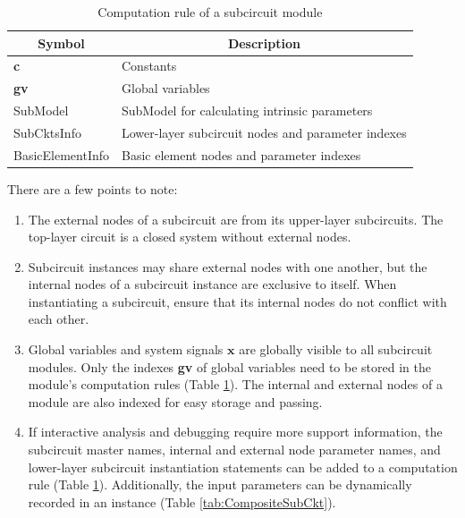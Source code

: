 \begin{table}[htbp]
\centering
\caption{Computation rule of a subcircuit module}\label{tab:BasicCompositeSubCktRule}
\begin{tabular}{l|l}
	\hline
	\multicolumn{1}{c|}{Symbol} & \multicolumn{1}{c}{Description}\\
	\hline
	\textbf{c}       & Constants\\
	\textbf{gv}      & Global variables\\
	SubModel         & SubModel for calculating intrinsic parameters \\
	SubCktsInfo      & Lower-layer subcircuit nodes and parameter indexes \\
	BasicElementInfo & Basic element nodes and parameter indexes \\
	\hline
\end{tabular}
\end{table}
There are a few points to note:
\begin{enumerate}[partopsep=0pt,topsep=0pt,itemsep=0pt,parsep=0pt]
\item The external nodes of a subcircuit are from its upper-layer subcircuits. The top-layer circuit is a closed system without external nodes.
\item Subcircuit instances may share external nodes with one another, but the internal nodes of a subcircuit instance are exclusive to itself. When instantiating a subcircuit, ensure that its internal nodes do not conflict with each other.
\item Global variables and system signals $\bm{x}$ are globally visible to all subcircuit modules. Only the indexes \textbf{gv} of global variables need to be stored in the module's computation rules (Table \ref{tab:BasicCompositeSubCktRule}). The internal and external nodes of a module are also indexed for easy storage and passing.
\item If interactive analysis and debugging require more support information, the subcircuit master names, internal and external node parameter names, and lower-layer subcircuit instantiation statements can be added to a computation rule (Table \ref{tab:BasicCompositeSubCktRule}). Additionally, the input parameters can be dynamically recorded in an instance (Table \ref{tab:CompositeSubCkt}).
\end{enumerate}

